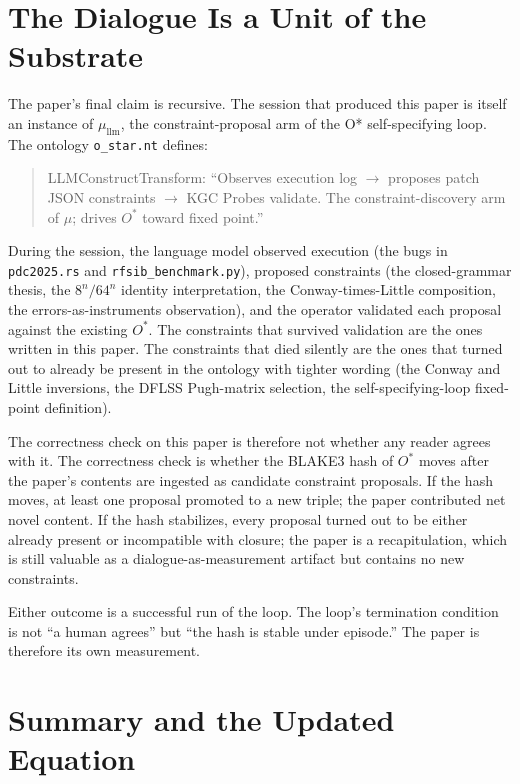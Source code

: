 \documentclass[11pt,letterpaper]{article}
\begin{document}
\section{The Dialogue Is a Unit of the Substrate}

The paper's final claim is recursive. The session that produced this paper is itself an instance of $\mu_{\mathrm{llm}}$, the constraint-proposal arm of the O* self-specifying loop. The ontology \texttt{o\_star.nt} defines:

\begin{quote}
\small
\textsf{LLMConstructTransform}: ``Observes execution log $\to$ proposes patch JSON constraints $\to$ KGC Probes validate. The constraint-discovery arm of $\mu$; drives $O^{\ast}$ toward fixed point.''
\end{quote}

During the session, the language model observed execution (the bugs in \texttt{pdc2025.rs} and \texttt{rfsib\_benchmark.py}), proposed constraints (the closed-grammar thesis, the $8^{n} / 64^{n}$ identity interpretation, the Conway-times-Little composition, the errors-as-instruments observation), and the operator validated each proposal against the existing $O^{\ast}$. The constraints that survived validation are the ones written in this paper. The constraints that died silently are the ones that turned out to already be present in the ontology with tighter wording (the Conway and Little inversions, the DFLSS Pugh-matrix selection, the self-specifying-loop fixed-point definition).

The correctness check on this paper is therefore not whether any reader agrees with it. The correctness check is whether the BLAKE3 hash of $O^{\ast}$ moves after the paper's contents are ingested as candidate constraint proposals. If the hash moves, at least one proposal promoted to a new triple; the paper contributed net novel content. If the hash stabilizes, every proposal turned out to be either already present or incompatible with closure; the paper is a recapitulation, which is still valuable as a dialogue-as-measurement artifact but contains no new constraints.

Either outcome is a successful run of the loop. The loop's termination condition is not ``a human agrees'' but ``the hash is stable under episode.'' The paper is therefore its own measurement.

\section{Summary and the Updated Equation}
\end{document}
